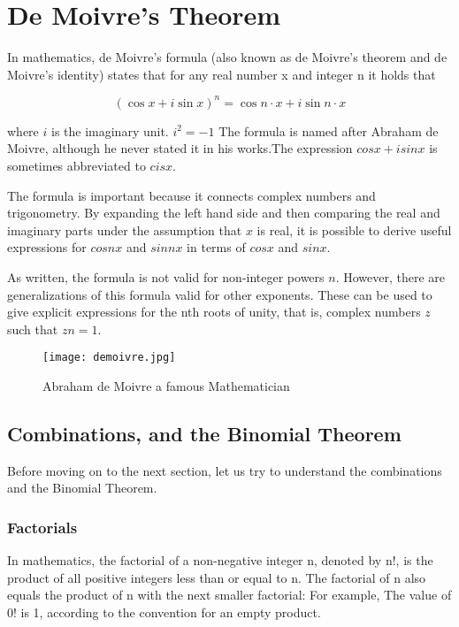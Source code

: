 \section{De Moivre's Theorem}
In mathematics, de Moivre's formula (also known as de Moivre's theorem and de Moivre's identity) states that for any real number x and integer n it holds that

    \begin{equation}
        (\cos{x}+i\sin{x})^{n} = \cos{n\cdot x}+i\sin{n\cdot x}
    \end{equation}

where $i$ is the imaginary unit. $i^2 = -1$ The formula is named after Abraham de Moivre, although he never stated it in his works.The expression $cosx + isinx$ is sometimes abbreviated to $cisx$.

The formula is important because it connects complex numbers and trigonometry. By expanding the left hand side and then comparing the real and imaginary parts under the assumption that $x$ is real, it is possible to derive useful expressions for $cosnx$ and $sinnx$ in terms of $cosx$ and $sinx$.

As written, the formula is not valid for non-integer powers $n$. However, there are generalizations of this formula valid for other exponents. These can be used to give explicit expressions for the nth roots of unity, that is, complex numbers $z$ such that $zn = 1$.

\begin{figure}[h!]
    \centering
    \texttt{[image: demoivre.jpg]}
    \caption{Abraham de Moivre a famous Mathematician}        
\end{figure}

\subsection{Combinations, and the Binomial Theorem}

Before moving on to the next section, let us try to understand the combinations and the Binomial Theorem.

\subsubsection{Factorials}

In mathematics, the factorial of a non-negative integer n, denoted by n!, is the product of all positive integers less than or equal to n. The factorial of n also equals the product of n with the next smaller factorial: For example, The value of 0! is 1, according to the convention for an empty product.


